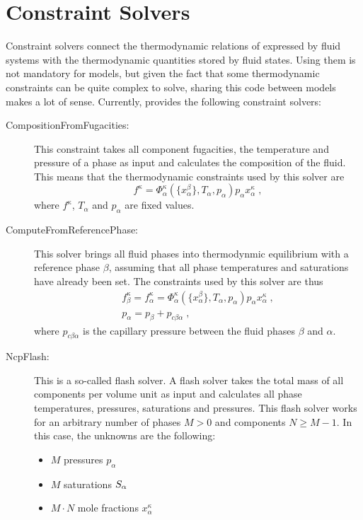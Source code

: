 \section{Constraint Solvers}
\label{sec:constraint_solvers}

Constraint solvers connect the thermodynamic relations of expressed by
fluid systems with the thermodynamic quantities stored by fluid
states. Using them is not mandatory for models, but given the fact
that some thermodynamic constraints can be quite complex to solve,
sharing this code between models makes a lot of sense. Currently,
\Dumux provides the following constraint solvers:
\begin{description}
\item[CompositionFromFugacities:] This constraint takes all
  component fugacities, the temperature and pressure of a phase as
  input and calculates the composition of the fluid. This means that
  the thermodynamic constraints used by this solver are
  \[
  f^\kappa = \Phi^\kappa_\alpha(\{x^\beta_\alpha \}, T_\alpha, p_\alpha)  p_\alpha x^\kappa_\alpha\;,
  \]
  where ${f^\kappa}$, $T_\alpha$ and $p_\alpha$ are fixed values.
\item[ComputeFromReferencePhase:] This solver brings all
  fluid phases into thermodynmic equilibrium with a reference phase
  $\beta$, assuming that all phase temperatures and saturations have
  already been set. The constraints used by this solver are thus
  \begin{eqnarray*}
  f^\kappa_\beta = f^\kappa_\alpha = \Phi^\kappa_\alpha(\{x^\beta_\alpha \}, T_\alpha, p_\alpha)  p_\alpha x^\kappa_\alpha\;, \\
  p_\alpha = p_\beta + p_{c\beta\alpha} \;,
  \end{eqnarray*}
  where $p_{c\beta\alpha}$ is the capillary pressure between the
  fluid phases $\beta$ and $\alpha$.
\item[NcpFlash:] This is a so-called flash solver. A flash
  solver takes the total mass of all components per volume unit as
  input and calculates all phase temperatures, pressures, saturations
  and pressures. This flash solver works for an arbitrary number of
  phases $M > 0$ and components $N \geq M - 1$. In this case,
  the unknowns are the following:
  \begin{itemize}
  \item $M$ pressures $p_\alpha$
  \item $M$ saturations $S_\alpha$
  \item $M\cdot N$ mole fractions $x^\kappa_\alpha$

\end{itemize}
\end{description}
